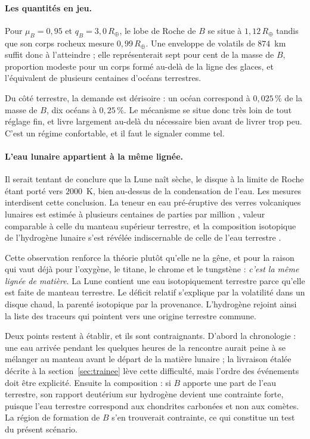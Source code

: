 \documentclass[11pt,a4paper,openany]{report}
\newcommand{\Rt}{R_{\oplus}}
\begin{document}
\paragraph{Les quantités en jeu.} Pour $\mu_B=0{,}95$ et $q_B=3{,}0\,\Rt$, le lobe de Roche de $B$
se situe à $1{,}12\,\Rt$ tandis que son corps rocheux mesure $0{,}99\,\Rt$. Une enveloppe de
volatils de $874$~km suffit donc à l'atteindre ; elle représenterait sept pour cent de la masse de
$B$, proportion modeste pour un corps formé au-delà de la ligne des glaces, et l'équivalent de
plusieurs centaines d'océans terrestres.

Du côté terrestre, la demande est dérisoire : un océan correspond à $0{,}025\,\%$ de la masse de
$B$, dix océans à $0{,}25\,\%$. Le mécanisme se situe donc très loin de tout réglage fin, et livre
largement au-delà du nécessaire bien avant de livrer trop peu. C'est un régime confortable, et il
faut le signaler comme tel.

\paragraph{L'eau lunaire appartient à la même lignée.} Il serait tentant de conclure que la Lune
naît sèche, le disque à la limite de Roche étant porté vers $2000$~K, bien au-dessus de la
condensation de l'eau. Les mesures interdisent cette conclusion. La teneur en eau pré-éruptive des
verres volcaniques lunaires est estimée à plusieurs centaines de parties par million
\cite{Saal2008}, valeur comparable à celle du manteau supérieur terrestre, et la composition
isotopique de l'hydrogène lunaire s'est révélée indiscernable de celle de l'eau terrestre
\cite{Saal2013}.

Cette observation renforce la théorie plutôt qu'elle ne la gêne, et pour la raison qui vaut déjà
pour l'oxygène, le titane, le chrome et le tungstène : \emph{c'est la même lignée de matière}. La
Lune contient une eau isotopiquement terrestre parce qu'elle est faite de manteau terrestre. Le
déficit relatif s'explique par la volatilité dans un disque chaud, la parenté isotopique par la
provenance. L'hydrogène rejoint ainsi la liste des traceurs qui pointent vers une origine
terrestre commune.

\begin{controle}
Deux points restent à établir, et ils sont contraignants. D'abord la chronologie : une eau arrivée
pendant les quelques heures de la rencontre aurait peine à se mélanger au manteau avant le départ
de la matière lunaire ; la livraison étalée décrite à la section~\ref{sec:trainee} lève cette
difficulté, mais l'ordre des événements doit être explicité. Ensuite la composition : si $B$
apporte une part de l'eau terrestre, son rapport deutérium sur hydrogène devient une contrainte
forte, puisque l'eau terrestre correspond aux chondrites carbonées et non aux comètes. La région de
formation de $B$ s'en trouverait contrainte, ce qui constitue un test du présent scénario.
\end{controle}
\end{document}

